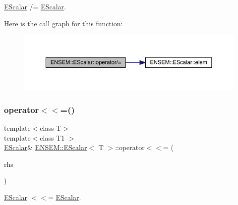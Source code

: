 \mbox{\hyperlink{classENSEM_1_1EScalar}{E\+Scalar}} /= \mbox{\hyperlink{classENSEM_1_1EScalar}{E\+Scalar}}. 

Here is the call graph for this function\+:
\nopagebreak
\begin{figure}[H]
\begin{center}
\leavevmode
\includegraphics[width=350pt]{d0/d82/classENSEM_1_1EScalar_a09524cf0f6f5baf9c421d03df58fe8d6_cgraph}
\end{center}
\end{figure}
\mbox{\label{classENSEM_1_1EScalar_a29ea96dc5698e4541307d65a0f1dfe6e}} 
\subsubsection{\texorpdfstring{operator$<$$<$=()}{operator<<=()}\hspace{0.1cm}{\footnotesize\ttfamily [1/3]}}
{\footnotesize\ttfamily template$<$class T$>$ \\
template$<$class T1 $>$ \\
\mbox{\hyperlink{classENSEM_1_1EScalar}{E\+Scalar}}\& \mbox{\hyperlink{classENSEM_1_1EScalar}{E\+N\+S\+E\+M\+::\+E\+Scalar}}$<$ T $>$\+::operator$<$$<$= (\begin{DoxyParamCaption}\item[{const \mbox{\hyperlink{classENSEM_1_1EScalar}{E\+Scalar}}$<$ T1 $>$ \&}]{rhs }\end{DoxyParamCaption})\hspace{0.3cm}{\ttfamily [inline]}}



\mbox{\hyperlink{classENSEM_1_1EScalar}{E\+Scalar}} $<$$<$= \mbox{\hyperlink{classENSEM_1_1EScalar}{E\+Scalar}}. 

